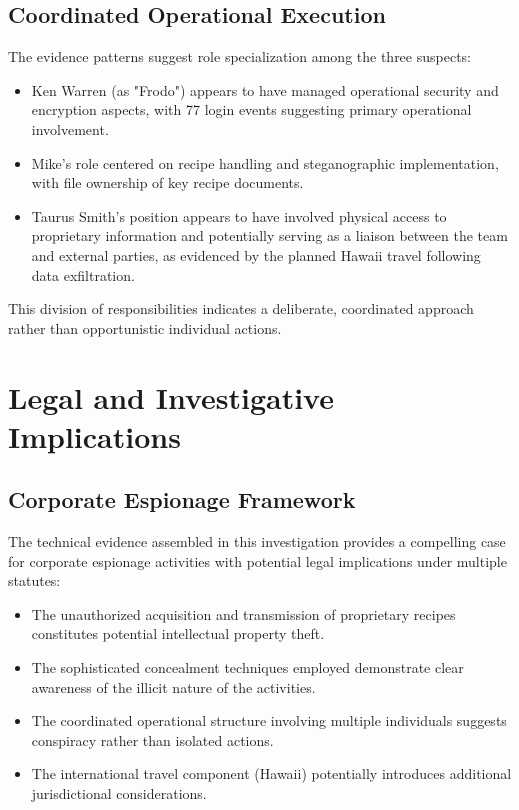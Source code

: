 \subsection{Coordinated Operational Execution}
The evidence patterns suggest role specialization among the three suspects:

\begin{itemize}
    \item Ken Warren (as "Frodo") appears to have managed operational security and encryption aspects, with 77 login events suggesting primary operational involvement.
    
    \item Mike's role centered on recipe handling and steganographic implementation, with file ownership of key recipe documents.
    
    \item Taurus Smith's position appears to have involved physical access to proprietary information and potentially serving as a liaison between the team and external parties, as evidenced by the planned Hawaii travel following data exfiltration.
\end{itemize}

This division of responsibilities indicates a deliberate, coordinated approach rather than opportunistic individual actions.

\section{Legal and Investigative Implications}

\subsection{Corporate Espionage Framework}
The technical evidence assembled in this investigation provides a compelling case for corporate espionage activities with potential legal implications under multiple statutes:

\begin{itemize}
    \item The unauthorized acquisition and transmission of proprietary recipes constitutes potential intellectual property theft.
    
    \item The sophisticated concealment techniques employed demonstrate clear awareness of the illicit nature of the activities.
    
    \item The coordinated operational structure involving multiple individuals suggests conspiracy rather than isolated actions.
    
    \item The international travel component (Hawaii) potentially introduces additional jurisdictional considerations.
\end{itemize}

